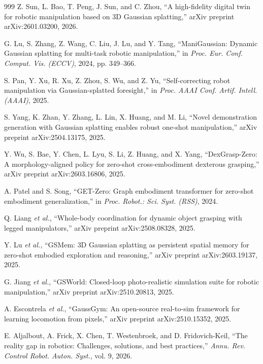 \documentclass[12pt,a4paper,oneside]{report}
\begin{document}
\begin{thebibliography}{999}
Z. Sun, L. Bao, T. Peng, J. Sun, and C. Zhou, ``A high-fidelity digital twin for robotic manipulation based on {3D} Gaussian splatting,'' arXiv preprint arXiv:2601.03200, 2026.

G. Lu, S. Zhang, Z. Wang, C. Liu, J. Lu, and Y. Tang, ``{ManiGaussian}: Dynamic Gaussian splatting for multi-task robotic manipulation,'' in \textit{Proc. Eur. Conf. Comput. Vis. (ECCV)}, 2024, pp. 349--366.

S. Pan, Y. Xu, R. Xu, Z. Zhou, S. Wu, and Z. Yu, ``Self-correcting robot manipulation via Gaussian-splatted foresight,'' in \textit{Proc. AAAI Conf. Artif. Intell. (AAAI)}, 2025.

S. Yang, K. Zhan, Y. Zhang, L. Lin, X. Huang, and M. Li, ``Novel demonstration generation with Gaussian splatting enables robust one-shot manipulation,'' arXiv preprint arXiv:2504.13175, 2025.

Y. Wu, S. Bae, Y. Chen, L. Lyu, S. Li, Z. Huang, and X. Yang, ``{DexGrasp-Zero}: A morphology-aligned policy for zero-shot cross-embodiment dexterous grasping,'' arXiv preprint arXiv:2603.16806, 2025.

A. Patel and S. Song, ``{GET-Zero}: Graph embodiment transformer for zero-shot embodiment generalization,'' in \textit{Proc. Robot.: Sci. Syst. (RSS)}, 2024.

Q. Liang \textit{et al.}, ``Whole-body coordination for dynamic object grasping with legged manipulators,'' arXiv preprint arXiv:2508.08328, 2025.

Y. Lu \textit{et al.}, ``{GSMem}: {3D} Gaussian splatting as persistent spatial memory for zero-shot embodied exploration and reasoning,'' arXiv preprint arXiv:2603.19137, 2025.

G. Jiang \textit{et al.}, ``{GSWorld}: Closed-loop photo-realistic simulation suite for robotic manipulation,'' arXiv preprint arXiv:2510.20813, 2025.

A. Escontrela \textit{et al.}, ``{GaussGym}: An open-source real-to-sim framework for learning locomotion from pixels,'' arXiv preprint arXiv:2510.15352, 2025.

E. Aljalbout, A. Frick, X. Chen, T. Westenbroek, and D. Fridovich-Keil, ``The reality gap in robotics: Challenges, solutions, and best practices,'' \textit{Annu. Rev. Control Robot. Auton. Syst.}, vol. 9, 2026.


\end{thebibliography}
\end{document}
